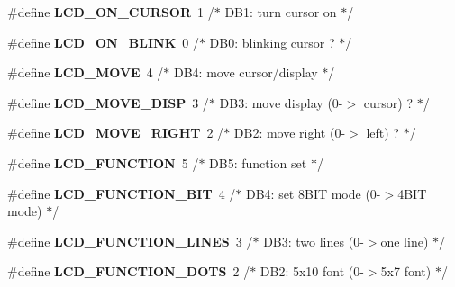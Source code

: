 \begin{DoxyCompactItemize}
\item 
\#define {\bfseries L\+C\+D\+\_\+\+O\+N\+\_\+\+C\+U\+R\+S\+OR}~1 /$\ast$   D\+B1\+: turn cursor on               $\ast$/\hypertarget{a00010_ga47638b5ebbaec9600a0ebf9a55caf802}{}\label{a00010_ga47638b5ebbaec9600a0ebf9a55caf802}

\item 
\#define {\bfseries L\+C\+D\+\_\+\+O\+N\+\_\+\+B\+L\+I\+NK}~0 /$\ast$     D\+B0\+: blinking cursor ?          $\ast$/\hypertarget{a00010_ga5d76592a978537acee615098ce4d80f5}{}\label{a00010_ga5d76592a978537acee615098ce4d80f5}

\item 
\#define {\bfseries L\+C\+D\+\_\+\+M\+O\+VE}~4 /$\ast$ D\+B4\+: move cursor/display            $\ast$/\hypertarget{a00010_ga3f4f758b80fcfa6c9e4db58e2515c78a}{}\label{a00010_ga3f4f758b80fcfa6c9e4db58e2515c78a}

\item 
\#define {\bfseries L\+C\+D\+\_\+\+M\+O\+V\+E\+\_\+\+D\+I\+SP}~3 /$\ast$   D\+B3\+: move display (0-\/$>$ cursor) ?  $\ast$/\hypertarget{a00010_gaaddc2afa9a02bfa748950f2c1e6a204d}{}\label{a00010_gaaddc2afa9a02bfa748950f2c1e6a204d}

\item 
\#define {\bfseries L\+C\+D\+\_\+\+M\+O\+V\+E\+\_\+\+R\+I\+G\+HT}~2 /$\ast$   D\+B2\+: move right (0-\/$>$ left) ?      $\ast$/\hypertarget{a00010_ga97cdb19acf109ad52ab4994d2ad02cee}{}\label{a00010_ga97cdb19acf109ad52ab4994d2ad02cee}

\item 
\#define {\bfseries L\+C\+D\+\_\+\+F\+U\+N\+C\+T\+I\+ON}~5 /$\ast$ D\+B5\+: function set                   $\ast$/\hypertarget{a00010_ga50de1697f1da8ab075a6b4d7aeace64e}{}\label{a00010_ga50de1697f1da8ab075a6b4d7aeace64e}

\item 
\#define {\bfseries L\+C\+D\+\_\+\+F\+U\+N\+C\+T\+I\+O\+N\+\_\+B\+IT}~4 /$\ast$   D\+B4\+: set 8\+B\+I\+T mode (0-\/$>$4\+B\+I\+T mode) $\ast$/\hypertarget{a00010_ga91d15d8e3008f6cb141406a8b5d0d3c0}{}\label{a00010_ga91d15d8e3008f6cb141406a8b5d0d3c0}

\item 
\#define {\bfseries L\+C\+D\+\_\+\+F\+U\+N\+C\+T\+I\+O\+N\+\_\+L\+I\+N\+ES}~3 /$\ast$   D\+B3\+: two lines (0-\/$>$one line)      $\ast$/\hypertarget{a00010_ga6c24806bed18d565917165caa3475463}{}\label{a00010_ga6c24806bed18d565917165caa3475463}

\item 
\#define {\bfseries L\+C\+D\+\_\+\+F\+U\+N\+C\+T\+I\+O\+N\+\_\+D\+O\+TS}~2 /$\ast$   D\+B2\+: 5x10 font (0-\/$>$5x7 font)      $\ast$/\hypertarget{a00010_ga48de81358277fe4f2810c2b82f90397e}{}\label{a00010_ga48de81358277fe4f2810c2b82f90397e}


\end{DoxyCompactItemize}
